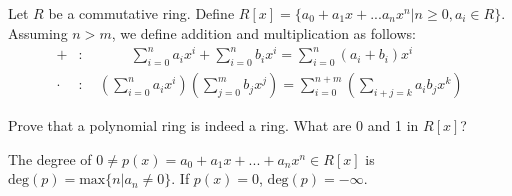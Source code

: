 \documentclass[10pt]{article}
\begin{document}
\begin{hdefinition}
    Let $R$ be a commutative ring. Define $R[x] = \{a_{0}+a_{1}x+...a_{n}x^{n}|n\geq 0, a_{i}\in R\}$. Assuming $n>m$, we define addition and multiplication as follows:
    \begin{align*}
        +&:\;\quad\qquad\sum_{i=0}^{n} a_{i}x^{i}+\sum_{i=0}^{n}b_{i}x^{i} = \sum_{i=0}^{n}(a_{i}+b_{i})x^{i}\\
        \cdot&: \quad\left(\sum_{i=0}^{n} a_{i}x^{i}\right)\left(\sum_{j=0}^{m}b_{j}x^{j}\right) = \sum_{i=0}^{n+m} \left(\sum_{i+j=k}a_{i}b_{j}x^k\right)
    \end{align*}
\end{hdefinition}
\begin{problem}
    Prove that a polynomial ring is indeed a ring. What are 0 and 1 in $R[x]$?
\end{problem}
\begin{hdefinition}[degree]
    The degree of $0\neq p(x)=a_{0} +a_{1}x+...+a_{n}x^{n}\in R[x]$ is $\text{deg}(p)=\text{max}\{n|a_{n}\neq 0\}$. If $p(x)= 0$, $\text{deg}(p)=-\infty$.
\end{hdefinition}
\end{document}

